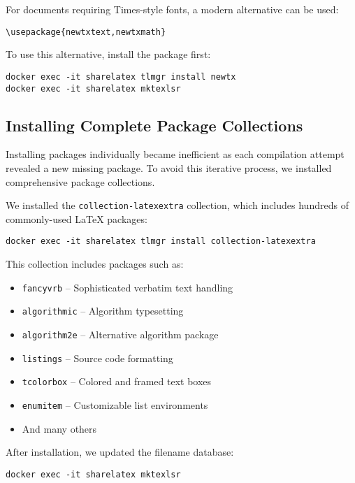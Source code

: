 For documents requiring Times-style fonts, a modern alternative can be used:

\begin{verbatim}
\usepackage{newtxtext,newtxmath}
\end{verbatim}

To use this alternative, install the package first:

\begin{verbatim}
docker exec -it sharelatex tlmgr install newtx
docker exec -it sharelatex mktexlsr
\end{verbatim}

\subsection{Installing Complete Package Collections}

Installing packages individually became inefficient as each compilation attempt revealed a new missing package. To avoid this iterative process, we installed comprehensive package collections.

We installed the \verb|collection-latexextra| collection, which includes hundreds of commonly-used LaTeX packages:

\begin{verbatim}
docker exec -it sharelatex tlmgr install collection-latexextra
\end{verbatim}

This collection includes packages such as:

\begin{itemize}
  \item \verb|fancyvrb| – Sophisticated verbatim text handling
  \item \verb|algorithmic| – Algorithm typesetting
  \item \verb|algorithm2e| – Alternative algorithm package
  \item \verb|listings| – Source code formatting
  \item \verb|tcolorbox| – Colored and framed text boxes
  \item \verb|enumitem| – Customizable list environments
  \item And many others
\end{itemize}

After installation, we updated the filename database:

\begin{verbatim}
docker exec -it sharelatex mktexlsr
\end{verbatim}

